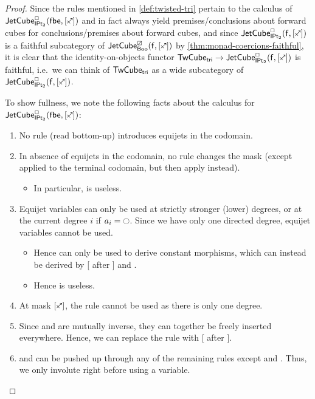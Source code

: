 \documentclass[a4paper]{memoir}
\begin{document}
\begin{proof}
	Since the rules mentioned in \cref{def:twisted-tri} pertain to the calculus of $\jetcubetri \affine \bipointedsym {[\ypolar]}$ and in fact always yield premises/conclusions about forward cubes for conclusions/premises about forward cubes, and since $\jetcubefwd \affine \bipointedsym {[\ypolar]}$ is a faithful subcategory of $\jetcubefwd \cartes \booleanalg {[\ypolar]}$ by \cref{thm:monad-coercions-faithful}, it is clear that the identity-on-objects functor $\twistedcubetri \to \jetcubefwd \affine \bipointedsym {[\ypolar]}$ is faithful, i.e.\ we can think of ${\mathsf{TwCube}}_{\mathsf{tri}}$ as a wide subcategory of $\jetcubefwd \affine \bipointedsym {[\ypolar]}$.
	
	To show fullness, we note the following facts about the calculus for $\jetcubetri \affine \bipointedsym {[\ypolar]}$:
	\begin{enumerate}
		\item No rule (read bottom-up) introduces equijets in the codomain.
		\item In absence of equijets in the codomain, no rule changes the mask (except  applied to the terminal codomain, but then apply  instead).
		\begin{itemize}
			\item In particular,  is useless.
		\end{itemize}
		\item Equijet variables can only be used at strictly stronger (lower) degrees, or at the current degree $i$ if $a_i = \npolar$. Since we have only one directed degree, equijet variables cannot be used.
		\begin{itemize}
			\item Hence  can only be used to derive constant morphisms, which can instead be derived by [ after ] and .
			\item Hence  is useless.
		\end{itemize} 
		\item At mask $[\ypolar]$, the rule  cannot be used as there is only one degree.
		\item Since  and  are mutually inverse, they can together be freely inserted everywhere. Hence, we can replace the rule  with [ after ].
		\item {} and  can be pushed up through any of the remaining rules except  and . Thus, we only involute right before using a variable.

\end{enumerate}
\end{proof}
\end{document}
